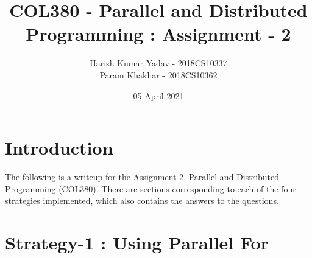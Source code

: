 \documentclass[12pt]{article}
\title{COL380 - Parallel and Distributed Programming : Assignment - 2}
\author{Harish Kumar Yadav - 2018CS10337 \\ Param Khakhar - 2018CS10362}
\date{05 April 2021}
\begin{document}
\maketitle

\section *{Introduction}

The following is a writeup for the Assignment-2, Parallel and Distributed Programming (COL380). There are sections corresponding to each of the four strategies implemented, which also contains the answers to the questions.

\section*{Strategy-1 : Using Parallel For}








\end{document}
